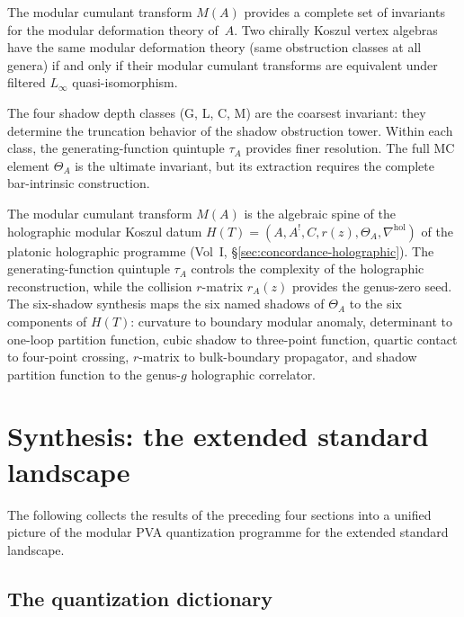 \begin{remark}
The modular cumulant transform $M(A)$ provides a complete set of
invariants for the modular deformation theory of~$A$. Two chirally
Koszul vertex algebras have the same modular deformation theory
(same obstruction classes at all genera) if and only if their
modular cumulant transforms are equivalent under filtered
$L_\infty$ quasi-isomorphism.

The four shadow depth classes (G, L, C, M) are the coarsest invariant:
they determine the truncation behavior of the shadow obstruction tower. Within
each class, the generating-function quintuple $\tau_A$ provides finer
resolution. The full MC element $\Theta_A$ is the ultimate invariant,
but its extraction requires the complete bar-intrinsic construction.
\end{remark}

\begin{remark}
The modular cumulant transform $M(A)$ is the algebraic spine of the
holographic modular Koszul datum
$H(T) = (A, A^!, C, r(z), \Theta_A, \nabla^{\mathrm{hol}})$
of the platonic holographic programme
(Vol~I, \S\ref*{sec:concordance-holographic}).
The generating-function quintuple $\tau_A$ controls the complexity of
the holographic reconstruction, while the collision $r$-matrix $r_A(z)$
provides the genus-zero seed. The six-shadow synthesis maps
the six named shadows of $\Theta_A$ to the six components of $H(T)$:
curvature to boundary modular anomaly, determinant to one-loop partition
function, cubic shadow to three-point function, quartic contact to
four-point crossing, $r$-matrix to bulk-boundary propagator, and shadow
partition function to the genus-$g$ holographic correlator.
\end{remark}

\section{Synthesis: the extended standard landscape}

The following collects the results of the preceding four sections into a
unified picture of the modular PVA quantization programme for the
extended standard landscape.

\subsection{The quantization dictionary}


